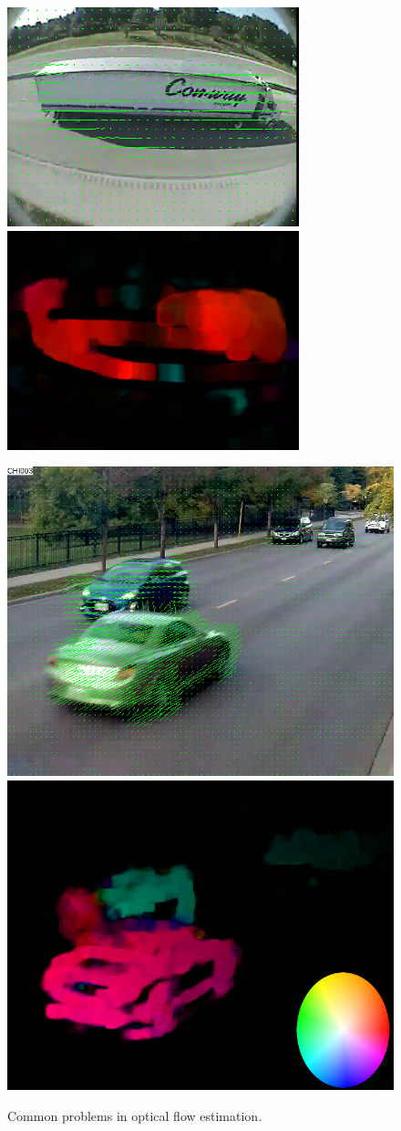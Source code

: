 \begin{figure}[!htbp]
\centering
    \begin{minipage}{0.96\columnwidth}
        \includegraphics[width=0.48\linewidth, height=0.3\linewidth]{./img/of/252707.png} 
        \includegraphics[width=0.48\linewidth, height=0.3\linewidth]{./img/of/252707_OF.png}
        \label{subfig:of-aperture}
    \end{minipage}
    \hspace{0.02\columnwidth}
    \begin{minipage}{0.96\columnwidth}
        \includegraphics[width=0.48\linewidth, height=0.3\linewidth]{./img/of/ILCHI_CHI003.png}
        \includegraphics[width=0.48\linewidth, height=0.3\linewidth]{./img/of/ILCHI_CHI003_OF_wheel.png}
        \label{subfig:of-occlusion}
    \end{minipage}
    \caption{Common problems in optical flow estimation.}
    \label{fig:tracker-of}
\end{figure}

